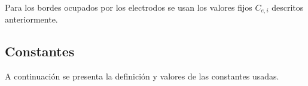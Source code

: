 Para los bordes ocupados por los electrodos se usan los valores fijos $C_{e,i}$ descritos anteriormente.

\clearpage
\subsection*{Constantes}
A continuación se presenta la definición y valores de las constantes usadas.

\newcommand{\lineaTabla}[3]{ ${#1}$ & {#3} & {#2} \\ }

\newcommand{\anodo}[3] {
	\lineaTabla{C_{a,{#1}}}{\num{#2} \si{#3}}{Concentración de #1 en el ánodo}
}

\newcommand{\catodo}[3] {
	\lineaTabla{C_{c,{#1}}}{\num{#2} \si{#3}}{Concentración de #1 en el cátodo}
}

